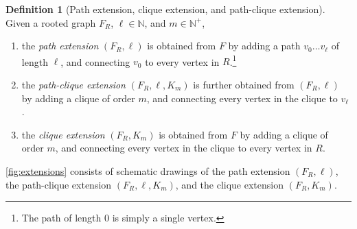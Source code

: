 \documentclass[11pt]{article}
\theoremstyle{definition}
\newtheorem{definition}[theorem]{Definition}
\theoremstyle{remark}
\newcommand{\N}{\mathbb{N}}
\begin{document}
\begin{definition}[Path extension, clique extension, and path-clique extension] \label{def:extension}
    Given a rooted graph $F_R$, $\ell \in \N$, and $m \in \N^+$,
    \begin{enumerate}[label=(\alph*)]
        \item the \emph{path extension} $(F_R, \ell)$ is obtained from $F$ by adding a path $v_0 \dots v_\ell$ of length $\ell$, and connecting $v_0$ to every vertex in $R$.\footnote{The path of length $0$ is simply a single vertex.}
        \item the \emph{path-clique extension} $(F_R, \ell, K_m)$ is further obtained from $(F_R, \ell)$ by adding a clique of order $m$, and connecting every vertex in the clique to $v_\ell$.
        \item the \emph{clique extension} $(F_R, K_m)$ is obtained from $F$ by adding a clique of order $m$, and connecting every vertex in the clique to every vertex in $R$.
    \end{enumerate}
\end{definition}

\cref{fig:extensions} consists of schematic drawings of the path extension $(F_R, \ell)$, the path-clique extension $(F_R, \ell, K_m)$, and the clique extension $(F_R, K_m)$.
\end{document}
